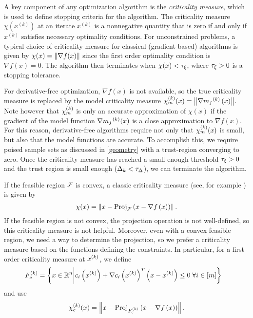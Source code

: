 \label{criticality_measure_section}
\label{criticallity_measure_section}

A key component of any optimization algorithm is the {\em criticality measure}, which is used to define stopping criteria for the algorithm.
The criticality measure $\chi(x^{(k)})$ at an iterate $x^{(k)}$ is a nonnegative quantity that is zero if and only if $x^{(k)}$ satisfies necessary optimality conditions.
For unconstrained problems,  a typical choice of criticality measure for classical (gradient-based) algorithms is given by $\chi(x) = {\left\|\nabla f(x)\right\|}$
since the first order optimality condition is $\nabla f(x)=0$.
The algorithm then terminates when $\chi(x) < \tau_{\xi}$, where $\tau_{\xi} >0$ is a stopping tolerance.

For derivative-free optimization,  $\nabla f(x)$ is not available,  so the true criticality measure is replaced by the model criticality measure
${\chi_m^{(k)}}(x) = {\left\|\nabla {{m}_f}^{(k)}\left(x\right)\right\|}.$
Note however that ${\chi_m^{(k)}}$ is only an accurate approximation of $\chi(x)$ if the gradient of the model function $\nabla {{m}_f}^{(k)}(x)$ is a close approximation to $\nabla f(x)$.
For this reason, derivative-free algorithms require not only that ${\chi_m^{(k)}}(x)$ is small, but also that the model functions are accurate.
To accomplish this, we require poised sample sets as discussed in \cref{geometry} with a trust-region converging to zero.
Once the criticality measure has reached a small enough threshold $\tau_{\xi} > 0$ and the trust region is small enough ($\Delta_k < \tau_{\Delta}$), we can terminate the algorithm.



If the feasible region ${\mathcal F}$ is convex, a classic criticality measure (see, for example \cite{Conejo:2013:GCT:2620806.2621814} \cite{Conn:2000:TM:357813}) is given by
\begin{align*}
\chi(x) = \left\|x - {\textrm{Proj}}_{{\mathcal F}}\left(x- \nabla f\left(x\right)\right)\right\|.
\end{align*}
If the feasible region is not convex, the projection operation is not well-defined, so this criticality measure is not helpful.
Moreover,  even with a convex feasible region, we need a way to determine the projection, so we prefer a criticality measure based on the  functions defining the constraints.   In particular, for
a first order criticality measure at $x^{(k)}$, we define
\begin{align}
{F_c^{(k)}} &= \left\{ x \in \mathbb R^n \bigg| c_i\left(x^{(k)}\right) + \nabla c_i\left(x^{(k)}\right)^T \left(x - x^{(k)}\right) \le 0 \; \forall i \in [m] \right\} \label{define_truefeasiblek}
\end{align}
and use
\begin{align}
\chi_c^{(k)}(x) = \left\|x - {\textrm{Proj}}_{{F_c^{(k)}}}\left(x- \nabla f\left(x\right)\right)\right\|. \label{define_true_criticality}
\end{align}

